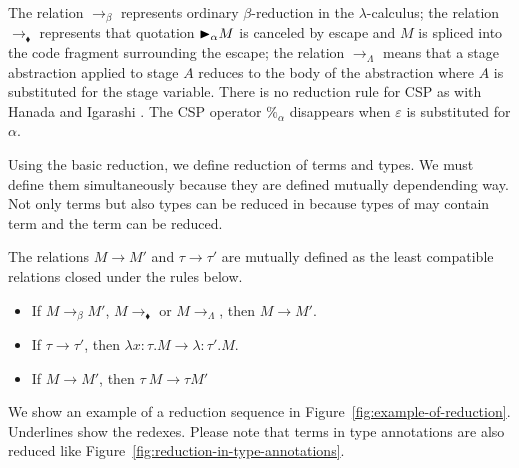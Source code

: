 The relation $\longrightarrow_\beta$ represents ordinary $\beta$-reduction in
the \(\lambda\)-calculus; the relation $\longrightarrow_\blacklozenge$
represents that quotation ${\mathop{\blacktriangleright}}_\alpha M$ is canceled by escape and $M$ is
spliced into the code fragment surrounding the escape; the relation
$\longrightarrow_\Lambda$ means that a stage abstraction applied to stage $A$
reduces to the body of the abstraction where $A$ is substituted for the stage
variable. There is no reduction rule for CSP as with Hanada and Igarashi
\cite{HanadaIgarashi2014CSP}. The CSP operator $\%_\alpha$ disappears when $\varepsilon$
is substituted for $\alpha$.

Using the basic reduction, we define reduction of terms and types. We must
define them simultaneously because they are defined mutually dependending way.
Not only terms but also types can be reduced in \LMD because types of \LMD may
contain term and the term can be reduced.  

\begin{definition}
    The relations \( M \longrightarrow M' \) and \( \tau \longrightarrow \tau'
    \) are mutually defined as the least compatible relations closed under the
    rules below.
    \begin{itemize}
        \item If \( M \longrightarrow_{\beta} M' \), \( M \longrightarrow_\blacklozenge \) or \( M \longrightarrow_\Lambda \), then \( M \longrightarrow M' \). \\
        \item If \( \tau \longrightarrow \tau' \), then \( \lambda x:\tau.M \longrightarrow \lambda:\tau'.M \). \\
        \item If \( M \longrightarrow M' \), then \( \tau\ M \longrightarrow \tau M' \)
    \end{itemize}
\end{definition}

We show an example of a reduction sequence in
Figure~\ref{fig:example-of-reduction}. Underlines show the redexes.  Please
note that terms in type annotations are also reduced like
Figure~\ref{fig:reduction-in-type-annotations}.

